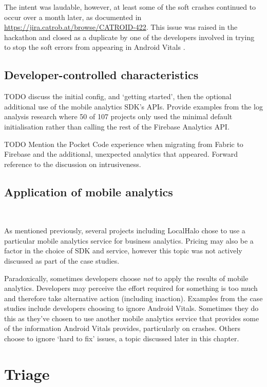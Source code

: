 The intent was laudable, however, at least some of the soft crashes continued to occur over a month later, as documented in \url{https://jira.catrob.at/browse/CATROID-422}. This issue was raised in the hackathon and closed as a duplicate by one of the developers involved in trying to stop the soft errors from appearing in Android Vitals \citep{catroid_426_soft_crashes_should_not_be_reported_to_the_play_console}.

\subsection{Developer-controlled characteristics}
TODO discuss the initial config, and `getting started', then the optional additional use of the mobile analytics SDK's APIs. Provide examples from the log analysis research where 50 of 107 projects only used the minimal default initialisation rather than calling the rest of the Firebase Analytics API. 

TODO Mention the Pocket Code experience when migrating from Fabric to Firebase and the additional, unexpected analytics that appeared. Forward reference to the discussion on intrusiveness. 


\subsection{Application of mobile analytics}~\label{aiu-application-of-mobile-analytics-section}

As mentioned previously, several projects including LocalHalo chose to use a particular mobile analytics service for business analytics. Pricing may also be a factor in the choice of SDK and service, however this topic was not actively discussed as part of the case studies.

Paradoxically, sometimes developers choose \emph{not} to apply the results of mobile analytics. Developers may perceive the effort required for something is too much and therefore take alternative action (including inaction). Examples from the case studies include developers choosing to ignore Android Vitals. Sometimes they do this as they've chosen to use another mobile analytics service that provides some of the information Android Vitals provides, particularly on crashes. Others choose to ignore `hard to fix' issues, a topic discussed later in this chapter.


\section{Triage}~\label{aiu-triage-section}

